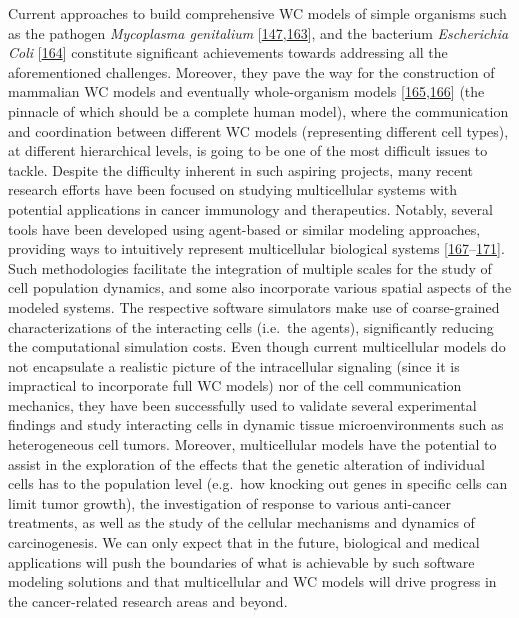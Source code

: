 \documentclass[
  12pt,
]{book}
\begin{document}
Current approaches to build comprehensive WC models of simple organisms such as the pathogen \emph{Mycoplasma genitalium} {[}\protect\hyperlink{ref-Karr2012}{147},\protect\hyperlink{ref-Burke2020}{163}{]}, and the bacterium \emph{Escherichia Coli} {[}\protect\hyperlink{ref-Carrera2014}{164}{]} constitute significant achievements towards addressing all the aforementioned challenges.
Moreover, they pave the way for the construction of mammalian WC models and eventually whole-organism models {[}\protect\hyperlink{ref-Szigeti2014}{165},\protect\hyperlink{ref-Viceconti2016}{166}{]} (the pinnacle of which should be a complete human model), where the communication and coordination between different WC models (representing different cell types), at different hierarchical levels, is going to be one of the most difficult issues to tackle.
Despite the difficulty inherent in such aspiring projects, many recent research efforts have been focused on studying multicellular systems with potential applications in cancer immunology and therapeutics.
Notably, several tools have been developed using agent-based or similar modeling approaches, providing ways to intuitively represent multicellular biological systems {[}\protect\hyperlink{ref-Ghaffarizadeh2018}{167}--\protect\hyperlink{ref-Stoll2020}{171}{]}.
Such methodologies facilitate the integration of multiple scales for the study of cell population dynamics, and some also incorporate various spatial aspects of the modeled systems.
The respective software simulators make use of coarse-grained characterizations of the interacting cells (i.e.~the agents), significantly reducing the computational simulation costs.
Even though current multicellular models do not encapsulate a realistic picture of the intracellular signaling (since it is impractical to incorporate full WC models) nor of the cell communication mechanics, they have been successfully used to validate several experimental findings and study interacting cells in dynamic tissue microenvironments such as heterogeneous cell tumors.
Moreover, multicellular models have the potential to assist in the exploration of the effects that the genetic alteration of individual cells has to the population level (e.g.~how knocking out genes in specific cells can limit tumor growth), the investigation of response to various anti-cancer treatments, as well as the study of the cellular mechanisms and dynamics of carcinogenesis.
We can only expect that in the future, biological and medical applications will push the boundaries of what is achievable by such software modeling solutions and that multicellular and WC models will drive progress in the cancer-related research areas and beyond.
\end{document}
